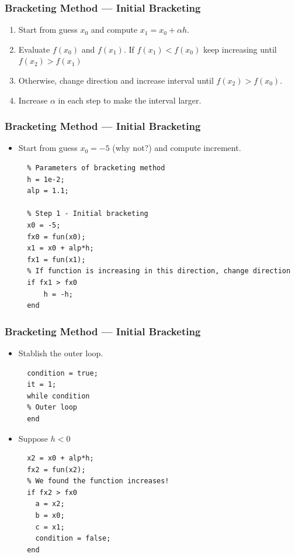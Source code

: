 \documentclass[11pt,xcolor={svgnames},aspectratio=169,usepdftitle=false,notheorems]{beamer}
\begin{document}
\begin{frame}
  \frametitle{Bracketing Method --- Initial Bracketing}
\begin{enumerate}
  \item Start from guess $x_0$ and compute $x_1 = x_0 + \alpha h$.
  \item Evaluate $f(x_0)$ and $f(x_1)$. If $f(x_1) < f(x_0)$ keep increasing until $f(x_2) > f(x_1)$
  \item Otherwise, change direction and increase interval until $f(x_2) > f(x_0)$.
  \item Increase $\alpha$ in each step to make the interval larger.
\end{enumerate}
\end{frame}

\begin{frame}[fragile]
  \frametitle{Bracketing Method --- Initial Bracketing}
\begin{itemize}
  \item Start from guess $x_0 = -5$ {\tiny (why not?)} and compute increment.
  \begin{lstlisting}
  % Parameters of bracketing method
  h = 1e-2;
  alp = 1.1;
    
  % Step 1 - Initial bracketing
  x0 = -5;
  fx0 = fun(x0);
  x1 = x0 + alp*h;
  fx1 = fun(x1);
  % If function is increasing in this direction, change direction  
  if fx1 > fx0
      h = -h;
  end
  \end{lstlisting}
\end{itemize}
\end{frame}

\begin{frame}[fragile]
  \frametitle{Bracketing Method --- Initial Bracketing}
\begin{itemize}
  \item Stablish the outer loop.
  \begin{lstlisting}
  condition = true;
  it = 1;
  while condition
  % Outer loop
  end
  \end{lstlisting}
  \item Suppose $h < 0$
  \begin{lstlisting}
  x2 = x0 + alp*h; 
  fx2 = fun(x2);
  % We found the function increases!
  if fx2 > fx0
    a = x2;
    b = x0;
    c = x1;
    condition = false;
  end
  \end{lstlisting}
\end{itemize}
\end{frame}
\end{document}
